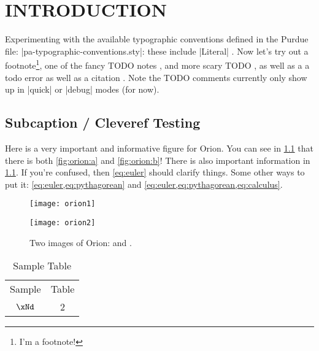 
\chapter{INTRODUCTION}
Experimenting with the available typographic conventions defined in the Purdue file: \NL \Literal|pa-typographic-conventions.sty|:  these include     \Literal|Literal|   . Now let's try out a footnote\footnote{I'm a footnote!}, one of the fancy TODO notes  , and more scary TODO , as well as a a todo error  as well as a citation \cite{Howell:1984_HaloOrbits}. Note the TODO comments currently only show up in \Literal|quick| or \Literal|debug| modes (for now).


\section{Subcaption / Cleveref Testing}
Here is a very important and informative figure for Orion. You can see in \cref{fig:orion} that there is both \cref{fig:orion:a} and \cref{fig:orion:b}! There is also important information in \cref{tab:sample_table}. If you're confused, then \cref{eq:euler} should clarify things. Some other ways to put it: \cref{eq:euler,eq:pythagorean} and \cref{eq:euler,eq:pythagorean,eq:calculus}. 

\begin{figure}[p]
    \centering
    \begin{subcaptionblock}{.49\textwidth}
        \centering
        \texttt{[image: orion1]}
        \caption{Orion 1}
        \label{fig:orion:a}
    \end{subcaptionblock} %
    \begin{subcaptionblock}{.49\textwidth}
        \centering
        \texttt{[image: orion2]}
        \caption{Orion 2}
        \label{fig:orion:b}
    \end{subcaptionblock} %
    \caption{Two images of Orion:  and .}
    \label{fig:orion}
\end{figure}

\begin{table}[p]
    \centering
    \caption{Sample Table}
    \begin{tabular}{|c|c|}
    \hline
        Sample & Table\\
        $\xNd$ & 2\\
    \hline
    \end{tabular}
    \label{tab:sample_table}
\end{table}

